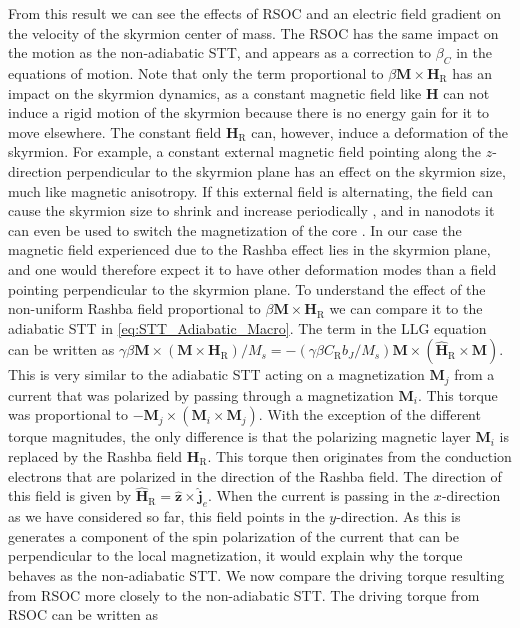 From this result we can see the effects of RSOC and an electric field gradient on the velocity of the skyrmion center of mass. The RSOC has the same impact on the motion as the non-adiabatic STT, and appears as a correction to $\beta_C$ in the equations of motion. Note that only the term proportional to $\beta\mathbold{M}\times\mathbold{H}_{\text{R}}$ has an impact on the skyrmion dynamics, as a constant magnetic field like $\mathbold{H}$ can not induce a rigid motion of the skyrmion because there is no energy gain for it to move elsewhere. The constant field $\mathbold{H}_{\text{R}}$ can, however, induce a deformation of the skyrmion. For example, a constant external magnetic field pointing along the $z$-direction perpendicular to the skyrmion plane has an effect on the skyrmion size, much like magnetic anisotropy. If this external field is alternating, the field can cause the skyrmion size to shrink and increase periodically \cite{Mochizuki2012}, and in nanodots it can even be used to switch the magnetization of the core \cite{Zhang2015}. In our case the magnetic field experienced due to the Rashba effect lies in the skyrmion plane, and one would therefore expect it to have other deformation modes than a field pointing perpendicular to the skyrmion plane. To understand the effect of the non-uniform Rashba field proportional to $\beta\mathbold{M}\times\mathbold{H}_{\text{R}}$ we can compare it to the adiabatic STT in \eqref{eq:STT_Adiabatic_Macro}. The term in the LLG equation can be written as $\gamma\beta\mathbold{M}\times(\mathbold{M}\times\mathbold{H}_{\text{R}})/M_s = -(\gamma\beta C_{\text{R}} b_J/M_s)\mathbold{M}\times(\mathbold{\hat{H}}_{\text{R}}\times\mathbold{M})$. This is very similar to the adiabatic STT acting on a magnetization $\mathbold{M}_j$ from a current that was polarized by passing through a magnetization $\mathbold{M}_i$. This torque was proportional to $-\mathbold{M}_j\times(\mathbold{M}_i\times\mathbold{M}_j)$. With the exception of the different torque magnitudes, the only difference is that the polarizing magnetic layer $\mathbold{M}_i$ is replaced by the Rashba field $\mathbold{H}_{\text{R}}$. This torque then originates from the conduction electrons that are polarized in the direction of the Rashba field. The direction of this field is given by $\mathbold{\hat{H}}_{\text{R}}=\mathbold{\hat{z}}\times\mathbold{\hat{j}}_e$. When the current is passing in the $x$-direction as we have considered so far, this field points in the $y$-direction. As this is generates a component of the spin polarization of the current that can be perpendicular to the local magnetization, it would explain why the torque behaves as the non-adiabatic STT. We now compare the driving torque resulting from RSOC more closely to the non-adiabatic STT. The driving torque from RSOC can be written as
